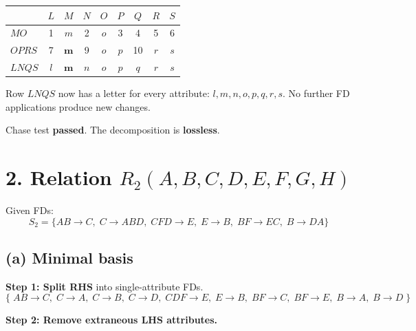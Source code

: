 \documentclass[11pt]{article}
\begin{document}
\begin{center}
\begin{tabular}{|l|c c c c c c c c|}
\hline
       & $L$ & $M$          & $N$ & $O$ & $P$ & $Q$ & $R$ & $S$ \\
\hline
$MO$   & 1   & $m$          & 2   & $o$ & 3   & 4   & 5   & 6   \\
$OPRS$ & 7   & $\mathbf{m}$ & 9   & $o$ & $p$ & 10  & $r$ & $s$ \\
$LNQS$ & $l$ & $\mathbf{m}$ & $n$ & $o$ & $p$ & $q$ & $r$ & $s$ \\
\hline
\end{tabular}
\end{center}

Row $LNQS$ now has a letter for every attribute:
$l, m, n, o, p, q, r, s$.
No further FD applications produce new changes.

Chase test \textbf{passed}. The decomposition is \textbf{lossless}.

\newpage
\section*{2. Relation $R_2(A,B,C,D,E,F,G,H)$}
Given FDs:
\[
S_2 = \{AB \to C,\; C \to ABD,\; CFD \to E,\;
        E \to B,\; BF \to EC,\; B \to DA\}
\]

\subsection*{(a) Minimal basis}

\textbf{Step 1: Split RHS} into single-attribute FDs.
\[
\{\;AB \to C,\;
C \to A,\; C \to B,\; C \to D,\;
CDF \to E,\;
E \to B,\;
BF \to C,\; BF \to E,\;
B \to A,\; B \to D
\;\}
\]

\bigskip
\textbf{Step 2: Remove extraneous LHS attributes.}
\end{document}
